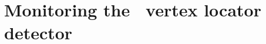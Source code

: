 \documentclass[a4paper,11pt]{memoir}
\begin{document}




\cleardoublepage

\part{Monitoring the \lhcb\ vertex locator detector}



\cleardoublepage

\appendix

\appendixpage*



\backmatter




\renewcommand{\bibname}{References}

\end{document}
